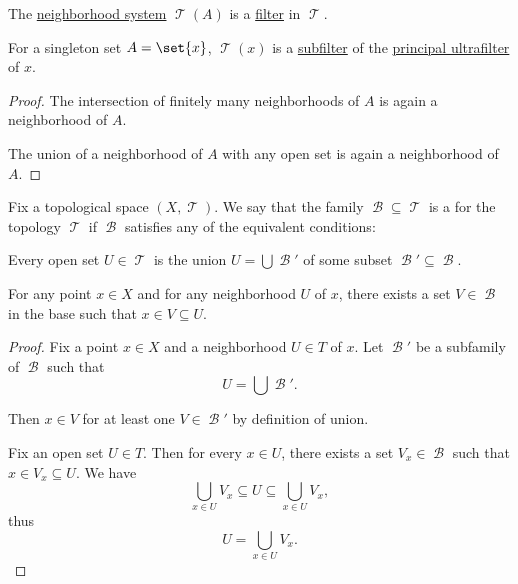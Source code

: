 \begin{proposition}\label{thm:neighborhood_filter}
  The \hyperref[def:neighborhood_system]{neighborhood system} \( \mscrT(A) \) is a \hyperref[def:lattice_ideal/ideal]{filter} in \( \mscrT \).
\end{proposition}
\begin{comments}
  \item For a singleton set \( A = \set{ x } \), \( \mscrT(x) \) is a \hyperref[def:lattice_ideal/submodel]{subfilter} of the \hyperref[ex:principal_ultrafilter]{principal ultrafilter} of \( x \).
\end{comments}
\begin{proof}
  The intersection of finitely many neighborhoods of \( A \) is again a neighborhood of \( A \).

  The union of a neighborhood of \( A \) with any open set is again a neighborhood of \( A \).
\end{proof}

\begin{definition}\label{def:topological_base}
  Fix a topological space \( (X, \mscrT) \). We say that the family \( \mscrB \subseteq \mscrT \) is a  for the topology \( \mscrT \) if \( \mscrB \) satisfies any of the equivalent conditions:
  \begin{thmenum}
     Every open set \( U \in \mscrT \) is the union \( U = \bigcup \mscrB' \) of some subset \( \mscrB' \subseteq \mscrB \).

    \medskip

     For any point \( x \in X \) and for any neighborhood \( U \) of \( x \), there exists a set \( V \in \mscrB \) in the base such that \( x \in V \subseteq U \).
  \end{thmenum}
\end{definition}
\begin{proof}
   Fix a point \( x \in X \) and a neighborhood \( U \in T \) of \( x \). Let \( \mscrB' \) be a subfamily of \( \mscrB \) such that
  \begin{equation*}
    U = \bigcup \mscrB'.
  \end{equation*}

  Then \( x \in V \) for at least one \( V \in \mscrB' \) by definition of union.

   Fix an open set \( U \in T \). Then for every \( x \in U \), there exists a set \( V_x \in \mscrB \) such that \( x \in V_x \subseteq U \). We have
  \begin{equation*}
    \bigcup_{x \in U} V_x \subseteq U \subseteq \bigcup_{x \in U} V_x,
  \end{equation*}
  thus
  \begin{equation*}
    U = \bigcup_{x \in U} V_x.
  \end{equation*}
\end{proof}

